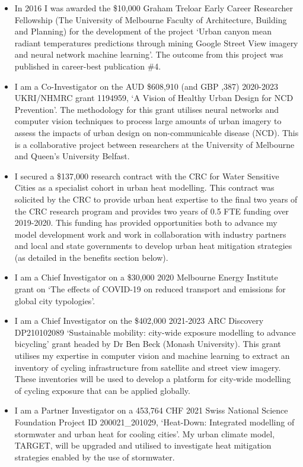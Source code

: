 \begin{itemize}
\item In 2016 I was awarded the \$10,000 Graham Treloar Early Career Researcher Fellowship (The University of Melbourne Faculty of Architecture, Building and Planning) for the development of the project `Urban canyon mean radiant temperatures predictions through mining Google Street View imagery and neural network machine learning'. The outcome from this project was published in career-best publication \#4.

\item I am a Co-Investigator on the AUD \$608,910 (and GBP ,387) 2020-2023 UKRI/NHMRC grant 1194959, `A Vision of Healthy Urban Design for NCD Prevention'. The methodology for this grant utilises neural networks and computer vision techniques to process large amounts of urban imagery to assess the impacts of urban design on non-communicable disease (NCD). This is a collaborative project between researchers at the University of Melbourne and Queen's University Belfast.

\item I secured a \$137,000 research contract with the CRC for Water Sensitive Cities as a specialist cohort in urban heat modelling. This contract was solicited by the CRC to provide urban heat expertise to the final two years of the CRC research program and provides two years of 0.5 FTE funding over 2019-2020. This funding has provided opportunities both to advance my model development work and work in collaboration with industry partners and local and state governments to develop urban heat mitigation strategies (as detailed in the benefits section below).

\item I am a Chief Investigator on a \$30,000 2020 Melbourne Energy Institute grant on `The effects of COVID-19 on reduced transport and emissions for global city typologies'. 

\item I am a Chief Investigator on the \$402,000 2021-2023 ARC Discovery DP210102089 `Sustainable mobility: city-wide exposure modelling to advance bicycling' grant headed by Dr Ben Beck (Monash University). This grant utilises my expertise in computer vision and machine learning to extract an inventory of cycling infrastructure from satellite and street view imagery. These inventories will be used to develop a platform for city-wide modelling of cycling exposure that can be applied globally.

\item I am a Partner Investigator on a 453,764 CHF 2021 Swiss National Science Foundation Project ID 200021\_201029, `Heat-Down: Integrated modelling of stormwater and urban heat for cooling cities'. My urban climate model, TARGET, will be upgraded and utilised to investigate heat mitigation strategies enabled by the use of stormwater.

\end{itemize}




